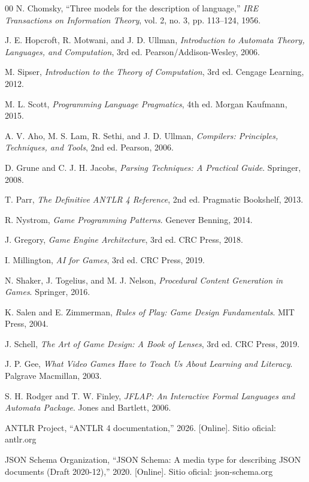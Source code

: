 \documentclass[9pt]{ieeeconf}
\begin{document}
\begin{thebibliography}{00}
N. Chomsky, ``Three models for the description of language,'' \emph{IRE Transactions on Information Theory}, vol. 2, no. 3, pp. 113--124, 1956.

J. E. Hopcroft, R. Motwani, and J. D. Ullman, \emph{Introduction to Automata Theory, Languages, and Computation}, 3rd ed. Pearson/Addison-Wesley, 2006.

M. Sipser, \emph{Introduction to the Theory of Computation}, 3rd ed. Cengage Learning, 2012.

M. L. Scott, \emph{Programming Language Pragmatics}, 4th ed. Morgan Kaufmann, 2015.

A. V. Aho, M. S. Lam, R. Sethi, and J. D. Ullman, \emph{Compilers: Principles, Techniques, and Tools}, 2nd ed. Pearson, 2006.

D. Grune and C. J. H. Jacobs, \emph{Parsing Techniques: A Practical Guide}. Springer, 2008.

T. Parr, \emph{The Definitive ANTLR 4 Reference}, 2nd ed. Pragmatic Bookshelf, 2013.

R. Nystrom, \emph{Game Programming Patterns}. Genever Benning, 2014.

J. Gregory, \emph{Game Engine Architecture}, 3rd ed. CRC Press, 2018.

I. Millington, \emph{AI for Games}, 3rd ed. CRC Press, 2019.

N. Shaker, J. Togelius, and M. J. Nelson, \emph{Procedural Content Generation in Games}. Springer, 2016.

K. Salen and E. Zimmerman, \emph{Rules of Play: Game Design Fundamentals}. MIT Press, 2004.

J. Schell, \emph{The Art of Game Design: A Book of Lenses}, 3rd ed. CRC Press, 2019.

J. P. Gee, \emph{What Video Games Have to Teach Us About Learning and Literacy}. Palgrave Macmillan, 2003.

S. H. Rodger and T. W. Finley, \emph{JFLAP: An Interactive Formal Languages and Automata Package}. Jones and Bartlett, 2006.

ANTLR Project, ``ANTLR 4 documentation,'' 2026. [Online]. Sitio oficial: antlr.org

JSON Schema Organization, ``JSON Schema: A media type for describing JSON documents (Draft 2020-12),'' 2020. [Online]. Sitio oficial: json-schema.org
\end{thebibliography}
\end{document}
